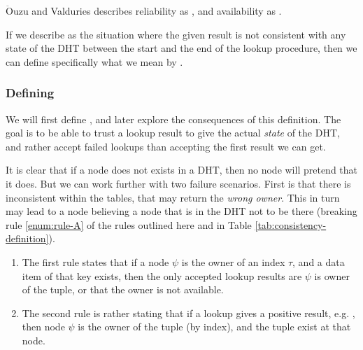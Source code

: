 $\mathrm{\ddot{O}}$uzu and Valduries \cite{oszu-99-podds} describes reliability as , and availability as . %

If we describe  as the situation where the given result
 is not consistent with any state of the DHT between the start and the end of
 the lookup procedure, then we can define specifically what we mean by
 .

\subsubsection{Defining }
\label{problem:DefiningConsistency}

We will first define , and later explore the consequences
 of this definition. The goal is to be able to trust a lookup result to
 give the actual \emph{state} of the DHT, and rather accept failed lookups than
 accepting the first result we can get.

It is clear that if a node does not exists in a DHT, then no node will pretend that
 it does. But we can work further with two failure scenarios. First is that there is
 inconsistent within the tables, that may return the \emph{wrong owner}. This in turn may
 lead to a node believing a node that is in the DHT not to be there (breaking rule
 \ref{enum:rule-A} of the rules outlined here and in Table
 \ref{tab:consistency-definition}).

{
\renewcommand{\theenumi}{{\em\Alph{enumi}}}
\begin{enumerate}
\item\label{enum:rule-A}
  The first rule states that if a node $\psi$ is the owner of
  an index $\tau$, and a data item of that key exists, then the
  only accepted lookup results are $\psi$ is owner of the tuple,
  or that the owner is not available.
\item\label{enum:rule-B}
  The second rule is rather stating that if a lookup gives a positive
  result, e.g. , then
  node $\psi$ is the owner of the tuple (by index), and the tuple exist
  at that node.
\end{enumerate}
}

